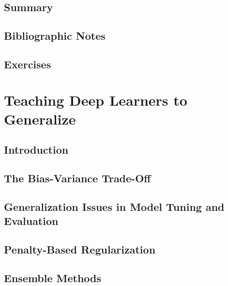 \documentclass[a4paper]{article}
\begin{document}
\subsection{Summary}

\subsection{Bibliographic Notes}

\subsection{Exercises}

\newpage
\section{Teaching Deep Learners to Generalize}
\subsection{Introduction}

\subsection{The Bias-Variance Trade-Off}

\subsection{Generalization Issues in Model Tuning and Evaluation}

\subsection{Penalty-Based Regularization}

\subsection{Ensemble Methods}
\end{document}
